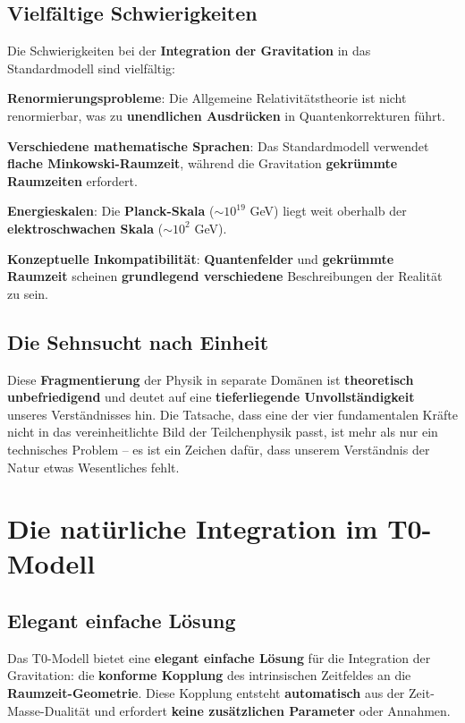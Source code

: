 \documentclass[12pt,a4paper]{report}
\begin{document}
	\subsection{Vielfältige Schwierigkeiten}
	
	Die Schwierigkeiten bei der \textbf{Integration der Gravitation} in das Standardmodell sind vielfältig:
	
	\textbf{Renormierungsprobleme}: Die Allgemeine Relativitätstheorie ist nicht renormierbar, was zu \textbf{unendlichen Ausdrücken} in Quantenkorrekturen führt.
	
	\textbf{Verschiedene mathematische Sprachen}: Das Standardmodell verwendet \textbf{flache Minkowski-Raumzeit}, während die Gravitation \textbf{gekrümmte Raumzeiten} erfordert.
	
	\textbf{Energieskalen}: Die \textbf{Planck-Skala} ($\sim 10^{19}$ GeV) liegt weit oberhalb der \textbf{elektroschwachen Skala} ($\sim 10^2$ GeV).
	
	\textbf{Konzeptuelle Inkompatibilität}: \textbf{Quantenfelder} und \textbf{gekrümmte Raumzeit} scheinen \textbf{grundlegend verschiedene} Beschreibungen der Realität zu sein.
	
	\subsection{Die Sehnsucht nach Einheit}
	
	Diese \textbf{Fragmentierung} der Physik in separate Domänen ist \textbf{theoretisch unbefriedigend} und deutet auf eine \textbf{tieferliegende Unvollständigkeit} unseres Verständnisses hin. Die Tatsache, dass eine der vier fundamentalen Kräfte nicht in das vereinheitlichte Bild der Teilchenphysik passt, ist mehr als nur ein technisches Problem -- es ist ein Zeichen dafür, dass unserem Verständnis der Natur etwas Wesentliches fehlt.
	
	\section{Die natürliche Integration im T0-Modell}
	
	\subsection{Elegant einfache Lösung}
	
	Das T0-Modell bietet eine \textbf{elegant einfache Lösung} für die Integration der Gravitation: die \textbf{konforme Kopplung} des intrinsischen Zeitfeldes an die \textbf{Raumzeit-Geometrie}. Diese Kopplung entsteht \textbf{automatisch} aus der Zeit-Masse-Dualität und erfordert \textbf{keine zusätzlichen Parameter} oder Annahmen.
	
\end{document}
